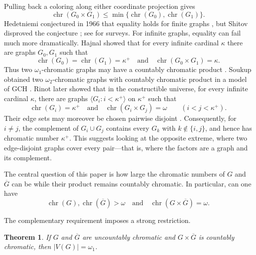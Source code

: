 \documentclass{amsart}
\numberwithin{equation}{section}
\newtheorem{theorem}{Theorem}[section]
\theoremstyle{definition}
\theoremstyle{remark}
\newcommand{\chr}{\operatorname{chr}}
\begin{document}
Pulling back a coloring along either coordinate projection gives
\begin{displaymath}
 \chr(G_0\times G_1)\leq
 \min\{\chr(G_0),\chr(G_1)\}.
\end{displaymath}
Hedetniemi conjectured in 1966 that equality holds for finite graphs
\cite{Hedetniemi1966}, but Shitov disproved the conjecture
\cite{Shitov2019}; see \cite{Sauer2001,Zhu2025} for surveys.  For
infinite graphs, equality can fail much more dramatically.  Hajnal
showed that for every infinite cardinal $\kappa$ there are graphs
$G_0,G_1$ such that
\begin{displaymath}
 \chr(G_0)=\chr(G_1)=\kappa^+
 \quad\text{and}\quad
 \chr(G_0\times G_1)=\kappa.
\end{displaymath}
Thus two $\omega_1$-chromatic graphs may have a countably chromatic
product \cite{Hajnal1985}.  Soukup obtained two $\omega_2$-chromatic
graphs with countably chromatic product in a model of GCH
\cite{Soukup1988}.  Rinot later showed that in the constructible
universe, for every infinite cardinal $\kappa$, there are graphs
$\langle G_i:i<\kappa^+\rangle$ on $\kappa^+$ such that
\begin{displaymath}
 \chr(G_i)=\kappa^+
 \quad\text{and}\quad
 \chr(G_i\times G_j)=\omega
 \qquad(i<j<\kappa^+).
\end{displaymath}
Their edge sets may moreover be chosen pairwise disjoint
\cite{Rinot2017}.  Consequently, for $i\ne j$, the complement of
$G_i\cup G_j$ contains every $G_k$ with $k\notin\{i,j\}$, and hence has
chromatic number $\kappa^+$.  This suggests looking at the opposite
extreme, where two edge-disjoint graphs cover every pair---that is,
where the factors are a graph and its complement.

The central question of this paper is how large the chromatic numbers
of $G$ and $\overline G$ can be while their product remains countably
chromatic.  In particular, can one have
\begin{equation}\label{eq:central}
 \chr(G),\chr(\overline G)>\omega
 \quad\text{and}\quad
 \chr(G\times\overline G)=\omega.                 \tag{$*$}
\end{equation}

The complementary requirement imposes a strong restriction.

\begin{theorem}\label{thm:size-bound}
If $G$ and $\overline G$ are uncountably chromatic and
$G\times\overline G$ is countably chromatic, then
$|V(G)|=\omega_1$.
\end{theorem}
\end{document}
